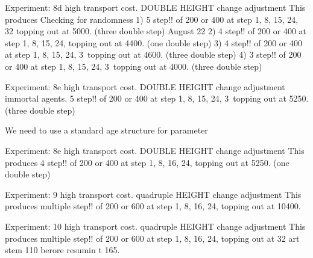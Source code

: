  Experiment: 8d  high transport cost. DOUBLE HEIGHT change adjustment
 This produces     Checking for randomness
1) 5 step!!  of 200  or 400 at step 1, 8, 15,  24, 32 topping out at 5000. (three double step)
August 22
2) 4 step!!  of 200  or 400 at step 1, 8, 15,  24,    topping out at 4400. (one double step)
3) 4 step!!  of 200  or 400 at step 1, 8, 15,  24, 3\ topping out at 4600. (three double step)
4) 3 step!!  of 200  or 400 at step 1, 8, 15,  24, 3\ topping out at 4000. (three double step)

 Experiment: 8e  high transport cost. DOUBLE HEIGHT change adjustment immortal agents. 
  5 step!!  of 200  or 400 at step 1, 8, 15,  24, 3\ topping out at 5250. (three double step)

We need to use a standard age structure for parameter 

 Experiment: 8e  high transport cost. DOUBLE HEIGHT change adjustment
 This produces 4 step!!  of 200  or 400 at step  1, 8, 16,  24, topping out at 5250. (one double step)

 Experiment: 9  high transport cost. quadruple HEIGHT change adjustment
 This produces multiple step!!  of 200  or 600 at step  1, 8, 16,  24, topping out at 10400. 
 
 Experiment: 10  high transport cost. quadruple HEIGHT change adjustment
 This produces multiple step!!  of 200  or 600 at step  1, 8, 16,  24, topping out at 32 art stem 110 berore resumin t 165. 